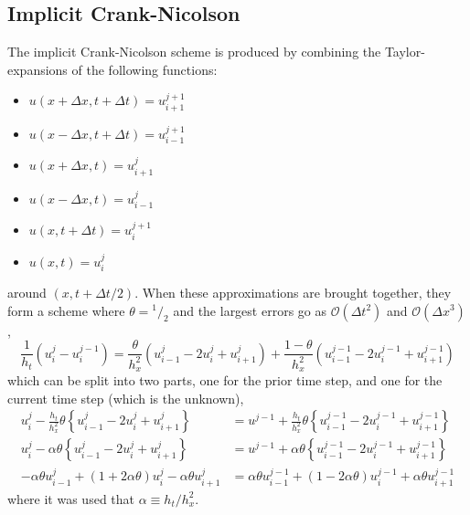 \documentclass[a4paper,11pt]{article}
\begin{document}
\subsection{Implicit Crank-Nicolson}
The implicit Crank-Nicolson scheme is produced by combining the Taylor-expansions of the following functions:
\begin{itemize}
    \item $u(x + \Delta x, t + \Delta t)    = u^{j+1}_{i+1}$
    \item $u(x - \Delta x, t + \Delta t)    = u^{j+1}_{i-1}$
    \item $u(x + \Delta x, t)               = u^j_{i+1}$
    \item $u(x - \Delta x, t)               = u^j_{i-1}$
    \item $u(x           , t + \Delta t)    = u^{j+1}_i$
    \item $u(x           , t)               = u^j_i$
\end{itemize}
around $(x, t + \Delta t /2)$. When these approximations are brought together, they form a scheme where $\theta = {}^1\!/_2$ and the largest errors go as $\mathcal{O}(\Delta t^2)$ and $\mathcal{O}\left( \Delta x^3 \right)$,
\begin{equation}
       \frac{1}{h_t} \left( u^j_i - u^{j-1}_i \right)
    =  \frac{\theta}{h_x^2} \left( u^j_{i-1} - 2 u^j_i + u^j_{i+1} \right) 
    +  \frac{1-\theta}{h_x^2} \left( 
        u^{j-1}_{i-1} - 2u^{j-1}_i + u^{j-1}_{i+1}
        \right)
    \label{eq:CN}
\end{equation}
which can be split into two parts, one for the prior time step, and one for the current time step (which is the unknown),
\begin{align*}
        u^j_i - \frac{h_t}{h_x^2} \theta 
        \left\{ u^j_{i-1} - 2 u^j_i + u^j_{i+1}  \right\} 
    &=  u^{j-1} + \frac{h_t}{h_x^2} \theta \left\{ u^{j-1}_{i-1} - 2u^{j-1}_i + u^{j-1}_{i+1}  \right\} \\
        u^j_i - \alpha \theta 
        \left\{ u^j_{i-1} - 2 u^j_i + u^j_{i+1}  \right\} 
    &=  u^{j-1} + \alpha \theta \left\{ u^{j-1}_{i-1} - 2u^{j-1}_i + u^{j-1}_{i+1}  \right\} \\
    -\alpha \theta u^j_{i-1} + \left( 1 + 2 \alpha \theta \right)u^j_i - \alpha \theta u^j_{i+1}
    &= \alpha \theta u^{j-1}_{i-1} + \left( 1 - 2 \alpha \theta \right)u^{j-1}_i + \alpha \theta u^{j-1}_{i+1}
\end{align*}
where it was used that $\alpha \equiv h_t/h_x^2$.
\end{document}
